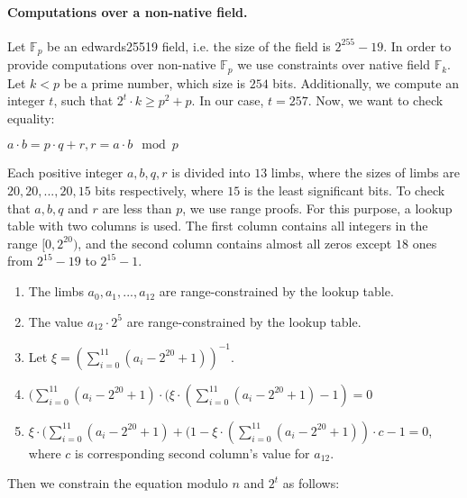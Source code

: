 \paragraph{Computations over a non-native field.}
Let $\mathbb{F}_p$ be an edwards25519 field, i.e. the size of the field is $2^{255} - 19$.
In order to provide computations over non-native $\mathbb{F}_p$ we use constraints over native field $\mathbb{F}_k$.
Let $k < p$ be a prime number, which size is $254$ bits.
Additionally, we compute an integer $t$, such that $2^t \cdot k \geq p^2 + p$.
In our case, $t = 257$.
Now, we want to check equality:
\begin{center}
$a\cdot b = p \cdot q + r, r = a\cdot b \mod p$
\end{center}
Each positive integer $a, b, q, r$ is divided into $13$ limbs, where the sizes of limbs are $20, 20, ..., 20, 15$ bits respectively, where $15$ is the least significant bits.
To check that $a, b, q$ and $r$ are less than $p$, we use range proofs.
For this purpose, a lookup table with two columns is used.
The first column contains all integers in the range $[0, 2^{20})$, and the second column contains almost all zeros except $18$ ones from $2^{15} - 19$ to $2^{15} - 1$.
\begin{enumerate}
\item The limbs $a_0, a_1, ..., a_{12}$ are range-constrained by the lookup table.
\item The value $a_{12} \cdot 2^5$ are range-constrained by the lookup table.
\item Let $\xi = (\sum_{i = 0}^{11} (a_i - 2^{20} + 1))^{-1}$.
\item $ (\sum_{i = 0}^{11} (a_i - 2^{20} + 1) \cdot (\xi \cdot (\sum_{i = 0}^{11} (a_i - 2^{20} + 1) - 1) = 0$
\item $\xi \cdot (\sum_{i = 0}^{11} (a_i - 2^{20} + 1) + (1 - \xi \cdot (\sum_{i = 0}^{11} (a_i - 2^{20} + 1))\cdot c - 1 = 0$, where $c$ is corresponding second column's value for $a_12$.
\end{enumerate}
Then we constrain the equation modulo $n$ and $2^t$ as follows:
